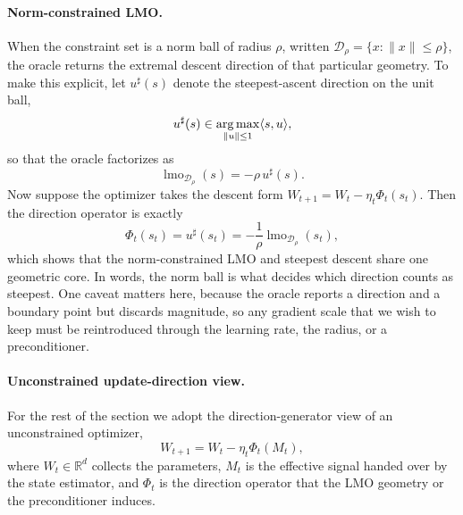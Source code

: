\paragraph{Norm-constrained LMO.}
When the constraint set is a norm ball of radius $\rho$, written $\mathcal{D}_\rho=\{x:\|x\|\le\rho\}$, the oracle returns the extremal descent direction of that particular geometry. To make this explicit, let $u^\sharp(s)$ denote the steepest-ascent direction on the unit ball,
\begin{equation}
  u^\sharp(s)\in\operatorname*{arg\,max}_{\|u\|\le 1}\langle s,u\rangle ,
\end{equation}
so that the oracle factorizes as
\begin{equation}
  \operatorname{lmo}_{\mathcal{D}_\rho}(s)=-\rho\,u^\sharp(s).
  \label{eq:lmo-norm}
\end{equation}
Now suppose the optimizer takes the descent form $W_{t+1}=W_t-\eta_t\Phi_t(s_t)$. Then the direction operator is exactly
\begin{equation}
  \Phi_t(s_t)=u^\sharp(s_t)=-\frac{1}{\rho}\operatorname{lmo}_{\mathcal{D}_\rho}(s_t),
  \label{eq:lmo-direction-operator}
\end{equation}
which shows that the norm-constrained LMO and steepest descent share one geometric core. In words, the norm ball is what decides which direction counts as steepest. One caveat matters here, because the oracle reports a direction and a boundary point but discards magnitude, so any gradient scale that we wish to keep must be reintroduced through the learning rate, the radius, or a preconditioner.

\paragraph{Unconstrained update-direction view.}
For the rest of the section we adopt the direction-generator view of an unconstrained optimizer,
\begin{equation}
  W_{t+1}=W_t-\eta_t\Phi_t(M_t),
  \label{eq:unconstrained-direction}
\end{equation}
where $W_t\in\mathbb{R}^d$ collects the parameters, $M_t$ is the effective signal handed over by the state estimator, and $\Phi_t$ is the direction operator that the LMO geometry or the preconditioner induces.

